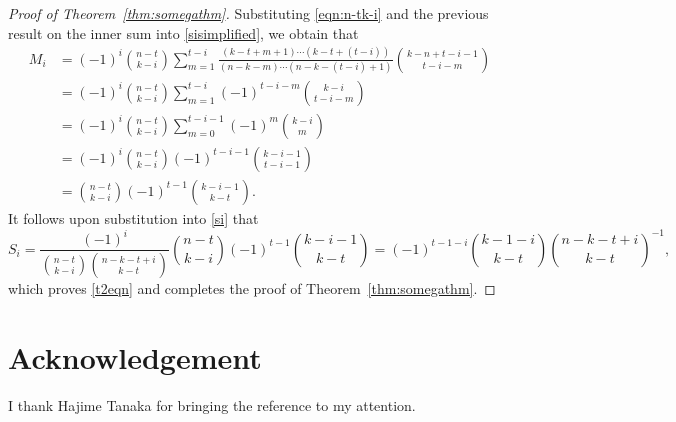 \documentclass[12pt]{article}
\theoremstyle{definition}
\theoremstyle{remark}
\begin{document}
\begin{proof}[Proof of Theorem~\ref{thm:somegathm}]
Substituting \eqref{eqn:n-tk-i} and the previous result on the inner sum into \eqref{sisimplified}, we obtain that
\begin{align*}
M_i &= (-1)^i\binom{n-t}{k-i}\sum_{m=1}^{t-i}\frac{(k-t+m+1)\cdots(k-t+(t-i))}{(n-k-m)\cdots(n-k-(t-i)+1)}\binom{k-n+t-i-1}{t-i-m}\\
&=(-1)^i\binom{n-t}{k-i}\sum_{m=1}^{t-i}(-1)^{t-i-m}\binom{k-i}{t-i-m}\\
&=(-1)^i\binom{n-t}{k-i}\sum_{m=0}^{t-i-1}(-1)^m\binom{k-i}{m}\\
&=(-1)^i\binom{n-t}{k-i}(-1)^{t-i-1}\binom{k-i-1}{t-i-1}\\
&=\binom{n-t}{k-i}(-1)^{t-1}\binom{k-i-1}{k-t}.
\end{align*}
It follows upon substitution into \eqref{si} that 
\[S_i = \frac{(-1)^i}{\binom{n-t}{k-i}\binom{n-k-t+i}{k-t}}\binom{n-t}{k-i}(-1)^{t-1}\binom{k-i-1}{k-t} = (-1)^{t-1-i} \binom{k-1-i}{k-t}\binom{n-k-t+i}{k-t}^{-1},\]
which proves \eqref{t2eqn} and completes the proof of Theorem~\ref{thm:somegathm}. 
\end{proof}

\section*{Acknowledgement}
I thank Hajime Tanaka for bringing the reference \cite{Tan3} to my attention.
\end{document}
